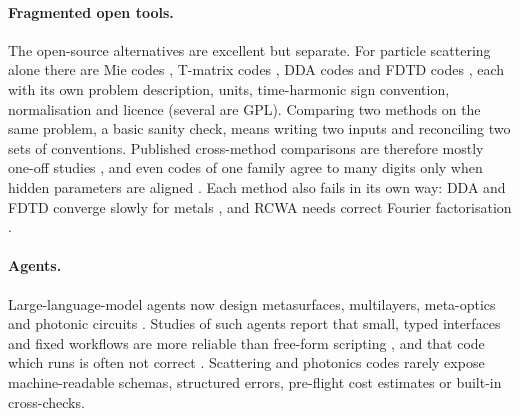 \documentclass[11pt]{article}
\begin{document}
\paragraph{Fragmented open tools.} The open-source alternatives are excellent but separate.
For particle scattering alone there are Mie codes \cite{Prahl2023miepython,PoinsinetdeSivry2023pymiesim,PenaPal2009},
T-matrix codes \cite{Beutel2024treams,Egel2021smuthi,Somerville2016smarties}, DDA codes
\cite{Draine1994,Yurkin2011adda,Wiecha2018pygdm,Ponomareva2025torchgdm} and FDTD codes
\cite{Oskooi2010meep,Mahlau2026fdtdx}, each with its own problem description, units,
time-harmonic sign convention, normalisation and licence (several are GPL). Comparing two methods
on the same problem, a basic sanity check, means writing two inputs and reconciling two sets of
conventions. Published cross-method comparisons are therefore mostly one-off studies
\cite{Parsons2010,Loke2014,Dieperink2024}, and even codes of one family agree to many digits only
when hidden parameters are aligned \cite{Argentin2026ddabench}. Each method also fails in its own
way: DDA and FDTD converge slowly for metals \cite{Yurkin2010gold,CalaLesina2015}, and RCWA needs
correct Fourier factorisation \cite{Li1996}.

\paragraph{Agents.} Large-language-model agents now design metasurfaces, multilayers, meta-optics
and photonic circuits
\cite{Lupoiu2025metachat,Kim2025llmphotonics,Huang2025mcp,Sharma2025phido,Wu2025picbench,Picopilot2026}.
Studies of such agents report that small, typed interfaces and fixed workflows are more reliable than
free-form scripting \cite{Huang2025mcp,Halo2026}, and that code which runs is often not correct
\cite{Mudur2025feabench}. Scattering and photonics codes rarely expose machine-readable schemas,
structured errors, pre-flight cost estimates or built-in cross-checks.
\end{document}
